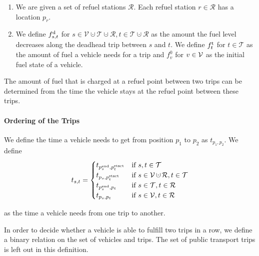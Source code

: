 \begin{definition}

\begin{enumerate}
	\item
We are given a set of refuel stations $\mathcal{R}$. Each refuel station $r\in\mathcal{R}$ has a location $p_r$.

	\item
We define $f^{\operatorname{d}}_{s,t}$ for ${s\in\mathcal{V}\cupdot\mathcal{T}\cupdot\mathcal{R}}, {t\in\mathcal{T}\cupdot\mathcal{R}}$ as the amount the fuel level decreases along the deadhead trip between $s$ and $t$. We define $f^{\operatorname{t}}_t$ for ${t\in\mathcal{T}}$ as the amount of fuel a vehicle needs for a trip and $f^0_v$ for $v\in\mathcal{V}$ as the initial fuel state of a vehicle.
\end{enumerate}

\end{definition}

The amount of fuel that is charged at a refuel point between two trips can be determined from the time the vehicle stays at the refuel point between these trips.

\paragraph{Ordering of the Trips} \parfill

We define the time a vehicle needs to get from position $p_1$ to $p_2$ as $t_{p_1,p_2}$. We define
\begin{equation*}
	t_{s,t} = 
	\begin{cases}
		t_{\pend_s,\pstart_t} & \text{if } s,t\in\mathcal{T} \\
		t_{p_s,\pstart_t} & \text{if } s\in\mathcal{V}\cupdot\mathcal{R}, t\in\mathcal{T} \\
		t_{\pend_s,p_t} & \text{if } s\in\mathcal{T}, t\in\mathcal{R} \\
		t_{p_s,p_t} & \text{if } s\in\mathcal{V},t\in\mathcal{R}
	\end{cases}
\end{equation*}

as the time a vehicle needs from one trip to another.

In order to decide whether a vehicle is able to fulfill two trips in a row, we define a binary relation on the set of vehicles and trips. The set of public transport trips is left out in this definition.

